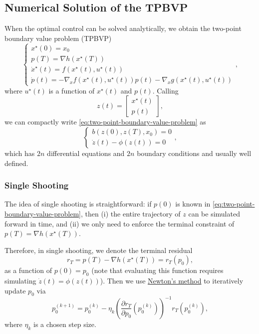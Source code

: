 \documentclass[
]{book}
\theoremstyle{definition}
\theoremstyle{definition}
\theoremstyle{definition}
\theoremstyle{definition}
\theoremstyle{remark}
\begin{document}
\hypertarget{numerical-solution-of-the-tpbvp}{%
\subsection{Numerical Solution of the TPBVP}\label{numerical-solution-of-the-tpbvp}}

When the optimal control can be solved analytically, we obtain the two-point boundary value problem (TPBVP)
\begin{equation}
\begin{cases}
x^\star(0) = x_0 \\
p(T) = \nabla h(x^\star(T)) \\
\dot{x}^\star(t) = f(x^\star(t), u^\star(t)) \\
\dot{p}(t) = - \nabla_x f(x^\star(t),u^\star(t))p(t) - \nabla_x g(x^\star(t),u^\star(t))
\end{cases},
\label{eq:two-point-boundary-value-problem}
\end{equation}
where \(u^\star(t)\) is a function of \(x^\star(t)\) and \(p(t)\). Calling
\[
z(t) = \begin{bmatrix} x^\star(t) \\ p(t) \end{bmatrix},
\]
we can compactly write \eqref{eq:two-point-boundary-value-problem} as
\begin{equation}
\begin{cases}
b(z(0),z(T),x_0) = 0 \\
\dot{z}(t) - \phi(z(t)) = 0
\end{cases},
\label{eq:two-point-boundary-value-problem-simple}
\end{equation}
which has \(2n\) differential equations and \(2n\) boundary conditions and usually well defined.

\hypertarget{single-shooting}{%
\subsubsection{Single Shooting}\label{single-shooting}}

The idea of single shooting is straightforward: if \(p(0)\) is known in \eqref{eq:two-point-boundary-value-problem}, then (i) the entire trajectory of \(z\) can be simulated forward in time, and (ii) we only need to enforce the terminal constraint of \(p(T) = \nabla h(x^\star(T))\).

Therefore, in single shooting, we denote the terminal residual
\[
r_T = p(T) - \nabla h(x^\star(T)) = r_T(p_0),
\]
as a function of \(p(0) = p_0\) (note that evaluating this function requires simulating \(\dot{z}(t) = \phi(z(t))\)). Then we use \href{https://en.wikipedia.org/wiki/Newton\%27s_method}{Newton's method} to iteratively update \(p_0\) via
\[
p_0^{(k+1)} = p_0^{(k)} - \eta_k \left( \frac{\partial r_T}{\partial p_0}(p_0^{(k)}) \right)^{-1} r_T(p_0^{(k)}),
\]
where \(\eta_k\) is a chosen step size.
\end{document}
